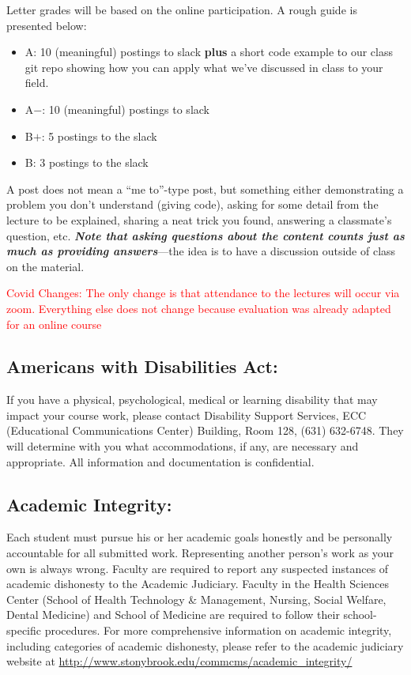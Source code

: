 \documentclass[11pt]{article}
\begin{document}
\noindent Letter grades will be based on the online participation.  A
rough guide is presented below:
\begin{itemize}
\item {\sf A\phantom{+}}: 10 (meaningful) postings to slack {\bf plus}
  a short code example to our class git repo showing how you can apply what
  we've discussed in class to your field.

\item {\sf A$-$}: 10 (meaningful) postings to slack

\item {\sf B$+$}: 5 postings to the slack

\item {\sf B\phantom{+}}:  3 postings to the slack
\end{itemize}
A post does not mean a ``me to''-type post, but something either
demonstrating a problem you don't understand (giving code), asking for
some detail from the lecture to be explained, sharing a neat trick you
found, answering a classmate's question, etc.  {\em \bfseries Note that asking
questions about the content counts just as much as providing
answers}---the idea is to have a discussion outside of class on the
material.

\textcolor{red}{Covid Changes: The only change is that attendance to
the lectures will occur via zoom. Everything else does not
change because evaluation was already adapted for an online course}

\subsection*{Americans with Disabilities Act: }

\noindent If you have a physical, psychological, medical or learning
disability that may impact your course work, please contact Disability
Support Services, ECC (Educational Communications Center) Building,
Room 128, (631) 632-6748. They will determine with you what
accommodations, if any, are necessary and appropriate. All information
and documentation is confidential.



\subsection*{Academic Integrity: }

\noindent Each student must pursue his or her academic goals honestly
and be personally accountable for all submitted work.  Representing
another person's work as your own is always wrong.  Faculty are
required to report any suspected instances of academic dishonesty to
the Academic Judiciary. Faculty in the Health Sciences Center (School
of Health Technology \& Management, Nursing, Social Welfare, Dental
Medicine) and School of Medicine are required to follow their
school-specific procedures. For more comprehensive information on
academic integrity, including categories of academic dishonesty,
please refer to the academic judiciary website at
\url{http://www.stonybrook.edu/commcms/academic_integrity/}
\end{document}
